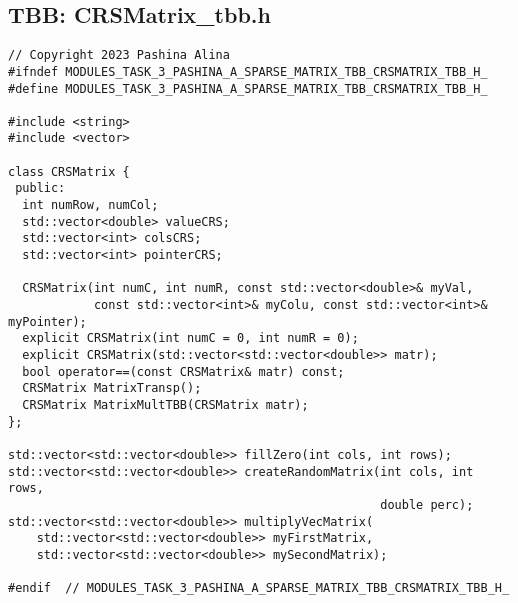 \documentclass[14pt, russian]{extarticle}
\begin{document}
	\subsection{TBB: CRSMatrix\_tbb.h}
	\begin{lstlisting}
// Copyright 2023 Pashina Alina
#ifndef MODULES_TASK_3_PASHINA_A_SPARSE_MATRIX_TBB_CRSMATRIX_TBB_H_
#define MODULES_TASK_3_PASHINA_A_SPARSE_MATRIX_TBB_CRSMATRIX_TBB_H_

#include <string>
#include <vector>

class CRSMatrix {
 public:
  int numRow, numCol;
  std::vector<double> valueCRS;
  std::vector<int> colsCRS;
  std::vector<int> pointerCRS;

  CRSMatrix(int numC, int numR, const std::vector<double>& myVal,
            const std::vector<int>& myColu, const std::vector<int>& myPointer);
  explicit CRSMatrix(int numC = 0, int numR = 0);
  explicit CRSMatrix(std::vector<std::vector<double>> matr);
  bool operator==(const CRSMatrix& matr) const;
  CRSMatrix MatrixTransp();
  CRSMatrix MatrixMultTBB(CRSMatrix matr);
};

std::vector<std::vector<double>> fillZero(int cols, int rows);
std::vector<std::vector<double>> createRandomMatrix(int cols, int rows,
                                                    double perc);
std::vector<std::vector<double>> multiplyVecMatrix(
    std::vector<std::vector<double>> myFirstMatrix,
    std::vector<std::vector<double>> mySecondMatrix);

#endif  // MODULES_TASK_3_PASHINA_A_SPARSE_MATRIX_TBB_CRSMATRIX_TBB_H_


	\end{lstlisting}
	\newpage
	
\end{document}
